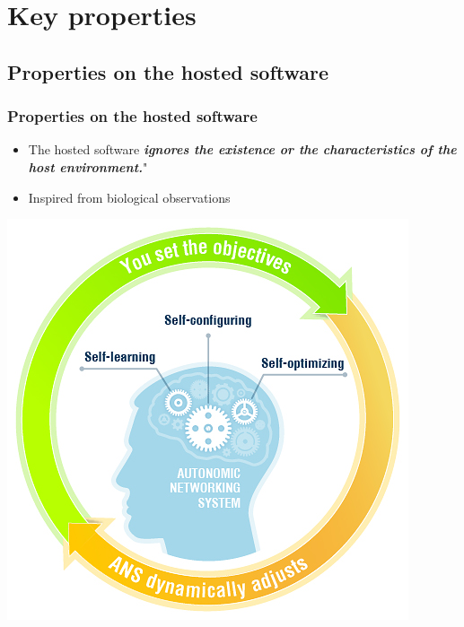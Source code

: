 \documentclass[11pt]{beamer}
\begin{document}
\section{Key properties}
    \subsection{Properties on the hosted software}
	\begin{frame}
		\frametitle{Properties on the hosted software}
		\begin{center}
        \begin{itemize}
			\item The hosted software \textbf{\textit{ignores the existence or the characteristics of the host environment.}}"\newline
			\item Inspired from biological observations
		\end{itemize}
        \includegraphics[scale=0.5]{ANS-BRAIN-2012.jpg}
		\end{center}
    \end{frame}
\end{document}
